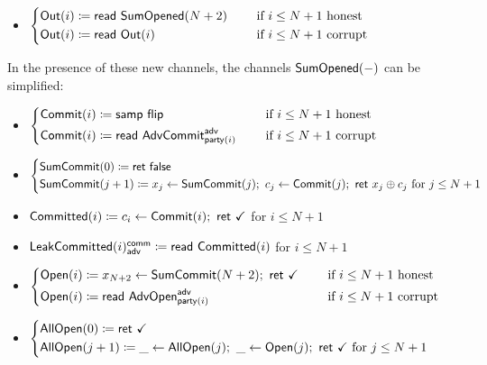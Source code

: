 \begin{itemize}
\item $\begin{cases*} \Out(i) \coloneqq \read{\SumOpened(N+2)} & \hspace{10pt} \text{if $i \leq N+1$ honest} \\ \Out(i) \coloneqq \read{\Out(i)} & \hspace{10pt} \text{if $i \leq N+1$ corrupt} \end{cases*}$
\end{itemize}

\noindent In the presence of these new channels, the channels $\mathsf{SumOpened}(-)$ can be simplified:

\begin{itemize}
\item {\color{blue} $\begin{cases*} \Commit(i) \coloneqq \samp{\flip} & \hspace{10pt} \text{if $i \leq N+1$ honest} \\ \Commit(i) \coloneqq \read{\AdvCommit^\adv_{\party(i)}} & \hspace{10pt} \text{if $i \leq N+1$ corrupt} \end{cases*}$}
\item {\color{blue} $\begin{cases*} \SumCommit(0) \coloneqq \ret{\false} \\ \SumCommit(j+1) \coloneqq x_j \leftarrow \SumCommit(j); \ c_j \leftarrow \Commit(j); \ \ret{x_j \oplus c_j} \text{ for $j \leq N+1$} \end{cases*}$}
\item {\color{magenta} $\mathsf{Committed}(i) \coloneqq c_i \leftarrow \mathsf{Commit}(i); \ \mathsf{ret} \ \checkmark$ for $i \leq N+1$}
\item {\color{magenta} $\mathsf{LeakCommitted}(i)^{\mathsf{comm}}_{\mathsf{adv}} \coloneqq \mathsf{read} \ \mathsf{Committed}(i)$ for $i \leq N+1$}
\item {\color{teal} $\begin{cases*} \Open(i) \coloneqq x_{N+2} \leftarrow \SumCommit(N+2); \ \ret{\checkmark} & \hspace{10pt} \text{if $i \leq N+1$ honest} \\ \Open(i) \coloneqq \read{\AdvOpen^\adv_{\party(i)}} & \hspace{10pt} \text{if $i \leq N+1$ corrupt} \end{cases*}$}
\item {\color{teal} $\begin{cases*} \AllOpen(0) \coloneqq \ret{\checkmark} \\ \AllOpen(j+1) \coloneqq \_ \leftarrow \AllOpen(j); \ \_ \leftarrow \Open(j); \ \ret{\checkmark} \text{ for $j \leq N+1$} \end{cases*}$}

\end{itemize}

